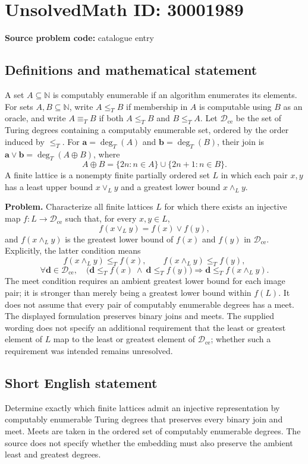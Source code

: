 \documentclass[11pt]{article}
\newcommand{\N}{\mathbb{N}}
\begin{document}
\section*{UnsolvedMath ID: 30001989}
\textbf{Source problem code:} catalogue entry
\subsection{Definitions and mathematical statement}
A set \(A\subseteq\N\) is computably enumerable if an algorithm enumerates its elements. For sets \(A,B\subseteq\N\), write \(A\leq_T B\) if membership in \(A\) is computable using \(B\) as an oracle, and write \(A\equiv_T B\) if both \(A\leq_T B\) and \(B\leq_T A\). Let \(\mathcal D_{\mathrm{ce}}\) be the set of Turing degrees containing a computably enumerable set, ordered by the order induced by \(\leq_T\). For \(\mathbf a=\deg_T(A)\) and \(\mathbf b=\deg_T(B)\), their join is \(\mathbf a\vee\mathbf b=\deg_T(A\oplus B)\), where
\[
A\oplus B=\{2n:n\in A\}\cup\{2n+1:n\in B\}.
\]
A finite lattice is a nonempty finite partially ordered set \(L\) in which each pair \(x,y\) has a least upper bound \(x\vee_L y\) and a greatest lower bound \(x\wedge_L y\).

\textbf{Problem.} Characterize all finite lattices \(L\) for which there exists an injective map \(f:L\longrightarrow\mathcal D_{\mathrm{ce}}\) such that, for every \(x,y\in L\),
\[
f(x\vee_L y)=f(x)\vee f(y),
\]
and \(f(x\wedge_L y)\) is the greatest lower bound of \(f(x)\) and \(f(y)\) in \(\mathcal D_{\mathrm{ce}}\). Explicitly, the latter condition means
\[
f(x\wedge_L y)\leq_T f(x),\qquad f(x\wedge_L y)\leq_T f(y),
\]
\[
\forall\mathbf d\in\mathcal D_{\mathrm{ce}},\quad
\bigl(\mathbf d\leq_T f(x)\ \land\ \mathbf d\leq_T f(y)\bigr)
\Longrightarrow \mathbf d\leq_T f(x\wedge_L y).
\]
The meet condition requires an ambient greatest lower bound for each image pair; it is stronger than merely being a greatest lower bound within \(f(L)\). It does not assume that every pair of computably enumerable degrees has a meet. The displayed formulation preserves binary joins and meets. The supplied wording does not specify an additional requirement that the least or greatest element of \(L\) map to the least or greatest element of \(\mathcal D_{\mathrm{ce}}\); whether such a requirement was intended remains unresolved.
\subsection{Short English statement}
Determine exactly which finite lattices admit an injective representation by computably enumerable Turing degrees that preserves every binary join and meet. Meets are taken in the ordered set of computably enumerable degrees. The source does not specify whether the embedding must also preserve the ambient least and greatest degrees.
\end{document}
